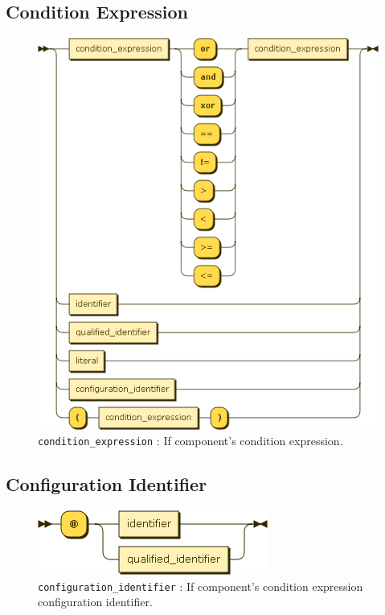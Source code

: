 \subsection{Condition Expression}
\begin{figure}[!h]
  \centering
    \includegraphics[scale=\DiagramScale]{chapters/compiler/diagrams/condition_expression}
  \caption{\texttt{condition\_expression} : If component's condition expression.}
  \label{fig:pcl-cond-expr}
\end{figure}

\subsection{Configuration Identifier}
\begin{figure}[!h]
  \centering
    \includegraphics[scale=\DiagramScale]{chapters/compiler/diagrams/configuration_identifier}
  \caption{\texttt{configuration\_identifier} : If component's condition expression configuration identifier.}
  \label{fig:pcl-config-id}
\end{figure}

